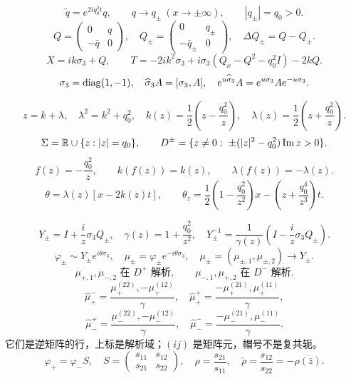 \documentclass[lang=cn,scheme=chinese,mode=simple,device=normal,color=blue,
math=cm,thmcnt=section,12pt]{elegantbook}
\begin{document}
\[
    \widetilde q=e^{2iq_0^2t}q,\qquad q\to q_\pm\ (x\to\pm\infty),\qquad |q_\pm|=q_0>0.
\]
\[
    Q=\begin{pmatrix}0&q\\-\bar q&0\end{pmatrix},\quad
    Q_\pm=\begin{pmatrix}0&q_\pm\\-\bar q_\pm&0\end{pmatrix},\quad \Delta Q_\pm=Q-Q_\pm.
\]
\[
    X=ik\sigma_3+Q,\qquad T=-2ik^2\sigma_3+i\sigma_3(Q_x-Q^2-q_0^2I)-2kQ.
\]
\[
    \sigma_3=\operatorname{diag}(1,-1),\quad \widehat\sigma_3 A=[\sigma_3,A],\quad
    e^{u\widehat\sigma_3}A=e^{u\sigma_3}Ae^{-u\sigma_3}.
\]

\[
    z=k+\lambda,\quad \lambda^2=k^2+q_0^2,\quad
    k(z)=\dfrac{1}{2}\left(z-\dfrac{q_0^2}{z}\right),\quad
    \lambda(z)=\dfrac{1}{2}\left(z+\dfrac{q_0^2}{z}\right).
\]
\[
    \Sigma=\mathbb R\cup\{z:|z|=q_0\},\qquad
    D^\pm=\{z\ne0:\ \pm(|z|^2-q_0^2)\operatorname{Im} z>0\}.
\]
\[
    f(z)=-\dfrac{q_0^2}{z},\qquad k(f(z))=k(z),\qquad\lambda(f(z))=-\lambda(z).
\]
\[
    \theta=\lambda(z)[x-2k(z)t],\qquad
    \theta_z=\dfrac{1}{2}\left(1-\dfrac{q_0^2}{z^2}\right)x-\left(z+\dfrac{q_0^4}{z^3}\right)t.
\]

\[
    Y_\pm=I+\dfrac{i}{z}\sigma_3Q_\pm,\quad
    \gamma(z)=1+\dfrac{q_0^2}{z^2},\quad
    Y_\pm^{-1}=\dfrac{1}{\gamma(z)}\left(I-\dfrac{i}{z}\sigma_3Q_\pm\right).
\]
\[
    \varphi_\pm\sim Y_\pm e^{i\theta\sigma_3},\quad
    \mu_\pm=\varphi_\pm e^{-i\theta\sigma_3},\quad
    \mu_\pm=(\mu_{\pm,1},\mu_{\pm,2})\to Y_\pm.
\]
\[
    \mu_{+,1},\mu_{-,2}\text{ 在 }D^+\text{ 解析},\qquad
    \mu_{-,1},\mu_{+,2}\text{ 在 }D^-\text{ 解析}.
\]
\[
    \widehat\mu_+^-=\dfrac{\mu_+^{(22)},-\mu_+^{(12)}}{\gamma},\quad
    \widehat\mu_+^+=\dfrac{-\mu_+^{(21)},\mu_+^{(11)}}{\gamma},
\]
\[
    \widehat\mu_-^+=\dfrac{\mu_-^{(22)},-\mu_-^{(12)}}{\gamma},\quad
    \widehat\mu_-^-=\dfrac{-\mu_-^{(21)},\mu_-^{(11)}}{\gamma}.
\]
它们是逆矩阵的行，上标是解析域；$(ij)$ 是矩阵元，帽号不是复共轭。
\[
    \varphi_+=\varphi_-S,\quad S=\begin{pmatrix}s_{11}&s_{12}\\s_{21}&s_{22}\end{pmatrix},\quad
    \rho=\dfrac{s_{21}}{s_{11}},\quad\widetilde\rho=\dfrac{s_{12}}{s_{22}}=-\overline{\rho(\bar z)}.
\]
\end{document}
